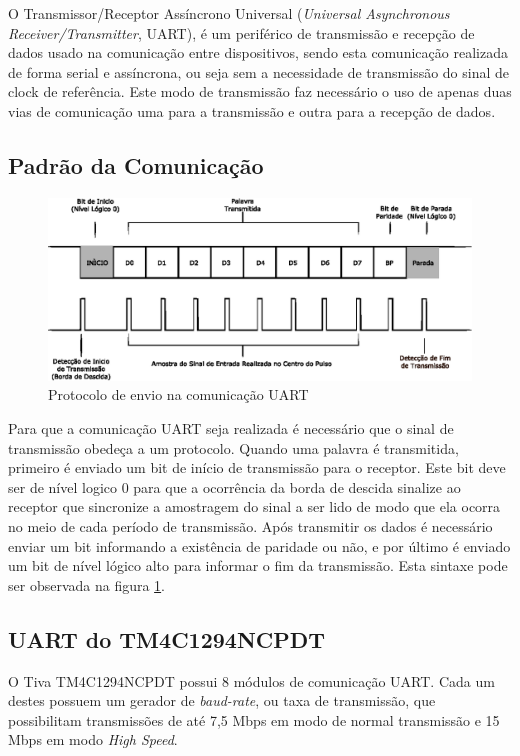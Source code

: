 O Transmissor/Receptor Assíncrono Universal (\emph{Universal Asynchronous Receiver/Transmitter}, UART), é um periférico de transmissão e recepção de dados usado na comunicação entre dispositivos, sendo esta comunicação realizada de forma serial e assíncrona, ou seja sem a necessidade de transmissão do sinal de clock de referência. Este modo de transmissão faz necessário o uso de apenas duas vias de comunicação uma para a transmissão e outra para a recepção de dados.

\subsection{Padrão da Comunicação}

\begin{figure}[H]
\centering
\includegraphics[width=1\textwidth] {figuras/uart.eps}
    \caption{Protocolo de envio na comunicação UART}
    \label{fig:uart}
\end{figure}

Para que a comunicação UART seja realizada é necessário que o sinal de transmissão obedeça a um protocolo. Quando uma palavra é transmitida, primeiro é enviado um bit de início de transmissão para o receptor. Este bit deve ser de nível logico 0 para que a ocorrência da borda de descida sinalize ao receptor que sincronize a amostragem do sinal a ser lido de modo que ela ocorra no meio de cada período de transmissão.  Após transmitir os dados é necessário enviar um bit informando a existência de paridade ou não, e por último é enviado um bit de nível lógico alto para informar o fim da transmissão. Esta sintaxe pode ser observada na figura \ref{fig:uart}.

\subsection{UART do TM4C1294NCPDT}


O Tiva TM4C1294NCPDT possui 8 módulos de comunicação UART. Cada um destes  possuem um gerador de \emph{baud-rate}, ou taxa de transmissão, que possibilitam  transmissões de até 7,5 Mbps em modo de normal transmissão e  15 Mbps em modo \emph{High Speed}. 

